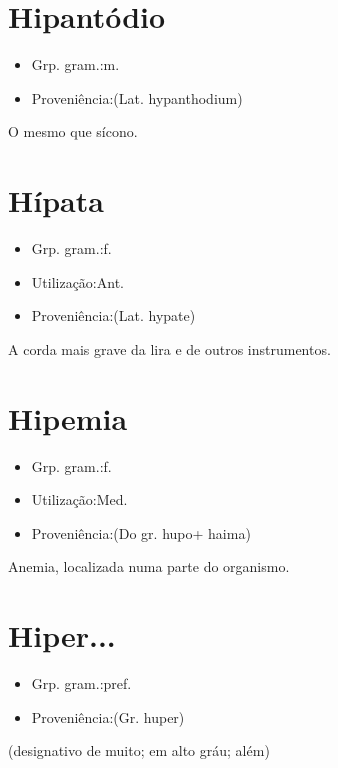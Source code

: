 \documentclass{article}
\begin{document}
\section{Hipantódio}
\begin{itemize}
\item {Grp. gram.:m.}
\end{itemize}
\begin{itemize}
\item {Proveniência:(Lat. \textunderscore hypanthodium\textunderscore )}
\end{itemize}
O mesmo que \textunderscore sícono\textunderscore .
\section{Hípata}
\begin{itemize}
\item {Grp. gram.:f.}
\end{itemize}
\begin{itemize}
\item {Utilização:Ant.}
\end{itemize}
\begin{itemize}
\item {Proveniência:(Lat. \textunderscore hypate\textunderscore )}
\end{itemize}
A corda mais grave da lira e de outros instrumentos.
\section{Hipemia}
\begin{itemize}
\item {Grp. gram.:f.}
\end{itemize}
\begin{itemize}
\item {Utilização:Med.}
\end{itemize}
\begin{itemize}
\item {Proveniência:(Do gr. \textunderscore hupo\textunderscore  + \textunderscore haima\textunderscore )}
\end{itemize}
Anemia, localizada numa parte do organismo.
\section{Hiper...}
\begin{itemize}
\item {Grp. gram.:pref.}
\end{itemize}
\begin{itemize}
\item {Proveniência:(Gr. \textunderscore huper\textunderscore )}
\end{itemize}
(designativo de \textunderscore muito\textunderscore ; \textunderscore em alto gráu\textunderscore ; \textunderscore além\textunderscore )
\end{document}
